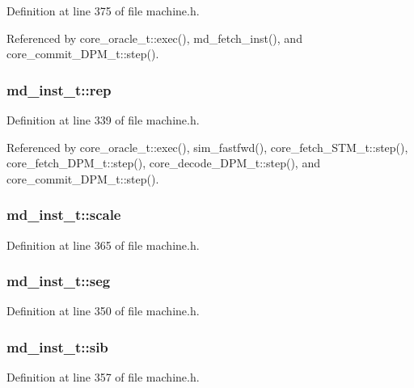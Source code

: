 Definition at line 375 of file machine.h.

Referenced by core\_\-oracle\_\-t::exec(), md\_\-fetch\_\-inst(), and core\_\-commit\_\-DPM\_\-t::step().
\subsubsection[{rep}]{ {\bf md\_\-inst\_\-t::rep}}\label{structmd__inst__t_3cb7c4132587d2f78d978d951ab0eef7}




Definition at line 339 of file machine.h.

Referenced by core\_\-oracle\_\-t::exec(), sim\_\-fastfwd(), core\_\-fetch\_\-STM\_\-t::step(), core\_\-fetch\_\-DPM\_\-t::step(), core\_\-decode\_\-DPM\_\-t::step(), and core\_\-commit\_\-DPM\_\-t::step().
\subsubsection[{scale}]{ {\bf md\_\-inst\_\-t::scale}}\label{structmd__inst__t_ef7bf58da1dac2cb75f24417b42c500f}




Definition at line 365 of file machine.h.
\subsubsection[{seg}]{ {\bf md\_\-inst\_\-t::seg}}\label{structmd__inst__t_6585da7b97a6aca3e3eb1c9c62f81401}




Definition at line 350 of file machine.h.
\subsubsection[{sib}]{ {\bf md\_\-inst\_\-t::sib}}\label{structmd__inst__t_3c1e6d5ddcc415c9c639405f2ae5e2bd}




Definition at line 357 of file machine.h.
